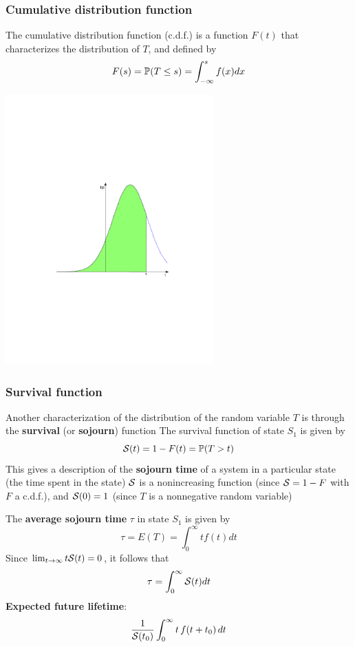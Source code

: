 \documentclass[aspectratio=43]{beamer}
\begin{document}
\begin{frame}\frametitle{Cumulative distribution function}
The cumulative distribution function (c.d.f.) is a function $F(t)$ that characterizes the distribution of $T$, and defined by
\[
F(s)=\IP(T\leq s)=\int_{-\infty}^sf(x)dx
\]
\begin{center}
\includegraphics[width=0.6\textwidth]{FIGS/cdf_auc}
\end{center}
\end{frame}

\begin{frame}\frametitle{Survival function}
Another characterization of the distribution of the random variable
$T$ is through the \textbf{survival} (or \textbf{sojourn}) function
\vfill
The survival function of state $S_1$ is given by 
\begin{equation}
  \S(t)=1-F(t)=\IP(T>t)
  \label{eq:survival}
\end{equation}
This gives a description of the \textbf{sojourn time} of a
system in a particular state (the time spent in the state)
\vfill
$\S$ is a nonincreasing function (since $\S=1-F$
with $F$ a c.d.f.), and
$\S(0)=1$ (since $T$ is a nonnegative random variable)
\end{frame}

\begin{frame}
The \textbf{average sojourn time} $\tau$ in state $S_1$ is given by
\[
\tau=E(T)=\int_0^\infty tf(t)dt
\]
Since $\lim_{t\to\infty}t\S(t)=0$, it follows that 
\[
\tau=\int_0^\infty \S(t)dt
\]
\vfill
\textbf{Expected future lifetime}:
\[
\frac{1}{\S(t_0)} \int_0^{\infty} t\,f(t+t_0)\,dt 
\]
\end{frame}
\end{document}
